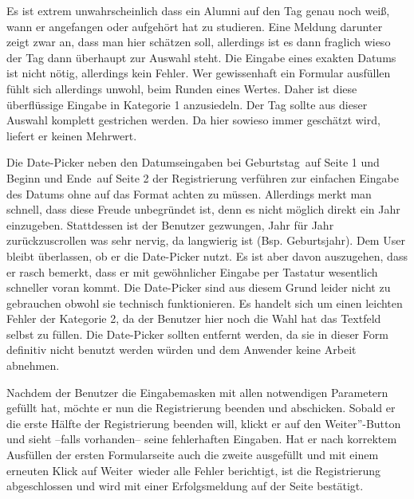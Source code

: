 { Es ist extrem unwahrscheinlich dass ein Alumni auf den Tag genau noch weiß, wann er angefangen oder aufgehört hat zu studieren. 
Eine Meldung darunter zeigt zwar an, dass man hier schätzen soll, allerdings ist es dann fraglich wieso der Tag dann überhaupt zur Auswahl steht.
}
{ Die Eingabe eines exakten Datums ist nicht nötig, allerdings kein Fehler. Wer gewissenhaft ein Formular ausfüllen fühlt sich allerdings unwohl, beim Runden eines
Wertes. Daher ist diese überflüssige Eingabe in Kategorie 1 anzusiedeln.
}
{ Der Tag sollte aus dieser Auswahl komplett gestrichen werden. Da hier sowieso immer geschätzt wird, liefert er keinen Mehrwert.
} 

{ Die Date-Picker neben den Datumseingaben bei \glqq Geburtstag\grqq ~auf Seite 1 und \glqq Beginn und Ende\grqq ~auf Seite 2 der Registrierung verführen zur einfachen Eingabe des Datums ohne auf das Format achten zu müssen. Allerdings merkt man schnell, dass diese Freude unbegründet ist, denn es nicht möglich direkt ein Jahr einzugeben. Stattdessen ist der Benutzer gezwungen, Jahr für Jahr zurückzuscrollen was sehr nervig, da langwierig ist (Bsp. Geburtsjahr).
}
{ Dem User bleibt überlassen, ob er die Date-Picker nutzt. Es ist aber davon auszugehen, dass er rasch bemerkt, dass er mit gewöhnlicher Eingabe per Tastatur wesentlich schneller voran kommt. Die Date-Picker sind aus diesem Grund leider nicht zu gebrauchen obwohl sie technisch funktionieren. Es handelt sich um einen leichten Fehler der Kategorie 2, da der Benutzer hier noch die Wahl hat das Textfeld selbst zu füllen.
}
{ Die Date-Picker sollten entfernt werden, da sie in dieser Form definitiv nicht benutzt werden würden und dem Anwender keine Arbeit abnehmen.
}





Nachdem der Benutzer die Eingabemasken mit allen notwendigen Parametern gefüllt hat, möchte er nun die Registrierung beenden und abschicken. Sobald
er die erste Hälfte der Registrierung beenden will, klickt er auf den \glqq Weiter”-Button und sieht --falls vorhanden-- seine fehlerhaften Eingaben. Hat er nach korrektem
Ausfüllen der ersten Formularseite auch die zweite ausgefüllt und mit einem erneuten Klick auf \glqq Weiter\grqq ~wieder alle Fehler berichtigt, ist die Registrierung abgeschlossen
und wird mit einer Erfolgsmeldung auf der Seite bestätigt.


